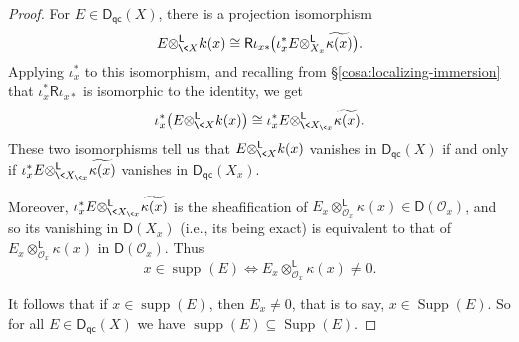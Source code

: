 \documentclass{compositio}
\theoremstyle{plain}
\theoremstyle{definition}
\theoremstyle{remark}
\numberwithin{equation}{thm}
\begin{document}
\begin{proof} 
For $E\in{{\boldsymbol{\mathsf{D}}}_{\mathsf{qc}}}(X)$, there is a  projection isomorphism{} 
\[
E{\otimes^{\mathsf L}_{{{\mkern-1mu}\<X}}}k(x)\cong {\mathsf R}\iota_{x*}{\mkern-1mu}\big(\iota_x^*E{\otimes^{\mathsf L}_{{X_x}}}\widetilde{\kappa(x)}\big).
\]
\vskip-1pt\noindent
Applying $\iota_x^*$ to this isomorphism, and  recalling from \S\ref{cosa:localizing-immersion} that $\iota_x^*{\mathsf R}\iota_{x*}$ is isomorphic to the identity, we get{}
\[
\iota_x^*\big(E{\otimes^{\mathsf L}_{{{\mkern-1mu}\<X}}}k(x)\big)\cong \iota_x^*E{\otimes^{\mathsf L}_{{{{{\mkern-1mu}\<X}}_{{\mkern-1mu}\<x}}}}\widetilde{\kappa(x)}.
\]
These two isomorphisms tell us that $E{\otimes^{\mathsf L}_{{{\mkern-1mu}\<X}}}k(x)$ vanishes in ${{\boldsymbol{\mathsf{D}}}_{\mathsf{qc}}}(X)$ if and only if $\iota_x^*E{\otimes^{\mathsf L}_{{{{{\mkern-1mu}\<X}}_{{\mkern-1mu}\<x}}}}\widetilde{\kappa(x)}$ vanishes in ${{\boldsymbol{\mathsf{D}}}_{\mathsf{qc}}}(X_x)$. 

Moreover, $\iota_x^*E{\otimes^{\mathsf L}_{{{{{\mkern-1mu}\<X}}_{{\mkern-1mu}\<x}}}}\widetilde{\kappa(x)}$
is the sheafification of $E_x{\otimes^{\mathsf L}_{{{\mathscr{O}}_x}}}\kappa(x)\in{\boldsymbol{\mathsf{D}}}({\mathscr{O}}_x)$, and so its vanishing in ${\boldsymbol{\mathsf{D}}}(X_x)$ (i.e., its being exact) is equivalent to that of $E_x{\otimes^{\mathsf L}_{{{\mathscr{O}}_x}}}\kappa(x)$ in ${\boldsymbol{\mathsf{D}}}({\mathscr{O}}_x)$. Thus{}
\[
x\in\operatorname{supp}(E) \iff E_x{\otimes^{\mathsf L}_{{{\mathscr{O}}_x}}}\kappa(x)\neq0.
\]

It follows that if $x\in\operatorname{supp}(E)$,  then $E_x\neq0$, that is to say, $x\in\operatorname{Supp}(E)$. So for all $E\in{{\boldsymbol{\mathsf{D}}}_{\mathsf{qc}}}(X)$ we have $\operatorname{supp}(E)\subseteq\operatorname{Supp}(E)$. {\vspace{2pt}}


\end{proof}
\end{document}
